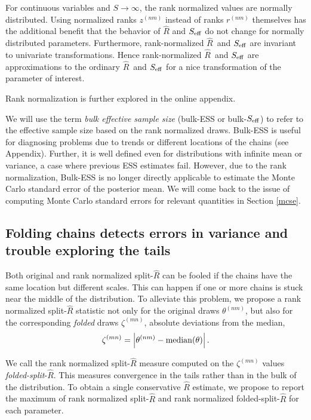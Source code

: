 \documentclass[american,]{article}
\newcommand{\Rhat}{$\widehat{R}$}
\begin{document}
For continuous variables and \(S \rightarrow \infty\), the rank
normalized values are normally distributed. Using normalized ranks
\(z^{(nm)}\) instead of ranks \(r^{(nm)}\) themselves has the additional
benefit that the behavior of \(\widehat{R}\) and \(S_{\rm eff}\) do
not change for normally distributed parameters.  Furthermore, rank-normalized \Rhat\ and \(S_{\rm eff}\) are invariant to univariate transformations. Hence    
rank-normalized \Rhat\ and \(S_{\rm eff}\) are approximations to the ordinary \Rhat\ and \(S_{\rm eff}\) for a nice transformation of the parameter of interest.

Rank normalization is further explored in the online appendix.

We will use the term \emph{bulk effective sample size} (bulk-ESS or
bulk-\(S_{\rm eff}\)) to refer to the effective sample size based on the
rank normalized draws. Bulk-ESS is useful for diagnosing problems due to
trends or different locations of the chains (see Appendix). Further, it is
well defined even for distributions with infinite mean or variance, a
case where previous ESS estimates fail. However, due to the rank
normalization, Bulk-ESS is no longer directly applicable to estimate the
Monte Carlo standard error of the posterior mean. We will come back to
the issue of computing Monte Carlo standard errors for relevant
quantities in Section \ref{mcse}.

\hypertarget{diagnostics-for-folded-draws}{%
\subsection{Folding chains detects errors in variance and trouble exploring the tails}\label{diagnostics-for-folded-draws}}


Both original and rank normalized split-\(\widehat{R}\) can be
fooled if the chains have the same location but different scales. This
can happen if one or more chains is stuck near the middle of the distribution. 
To alleviate this problem, we propose a
rank normalized split-\(\widehat{R}\) statistic not only for the
original draws \(\theta^{(nm)}\), but also for the corresponding {\em folded}
draws \(\zeta^{(mn)}\), absolute deviations from the median,
\begin{equation}
\label{zeta}
\zeta^{(mn)} = \left|\theta^{(nm)}-{\rm median}(\theta)\right|.
\end{equation}

We call the rank normalized split-\(\widehat{R}\) measure computed on the
 \(\zeta^{(mn)}\) values  \emph{folded-split}-\(\widehat{R}\).
  This measures convergence in the
tails rather than in the bulk of the distribution. To obtain a single
conservative \(\widehat{R}\) estimate, we propose to report the maximum
of rank normalized split-\(\widehat{R}\) and rank normalized
folded-split-\(\widehat{R}\) for each parameter.
\end{document}
